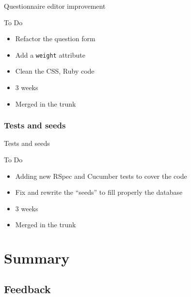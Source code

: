 \documentclass[10pt,a4paper]{beamer}
\begin{document}
\begin{frame}{Questionnaire editor improvement}
  \begin{block}{To Do}
    \begin{itemize}
      \item Refactor the question form
      \item Add a \texttt{weight} attribute
      \item Clean the CSS, Ruby code
    \end{itemize}
  \end{block}
  
  \begin{block}{}
    \begin{itemize}
      \item 3 weeks
      \item Merged in the trunk
    \end{itemize}
  \end{block}
\end{frame}

\subsubsection{Tests and seeds}

\begin{frame}{Tests and seeds}
  \begin{block}{To Do}
    \begin{itemize}
      \item Adding new RSpec and Cucumber tests to cover the code
      \item Fix and rewrite the ``seeds'' to fill properly the database
    \end{itemize}
  \end{block}
  
  \begin{block}{}
    \begin{itemize}
      \item 3 weeks
      \item Merged in the trunk
    \end{itemize}
  \end{block}
\end{frame}

\section{Summary}

\subsection{Feedback}
\end{document}
